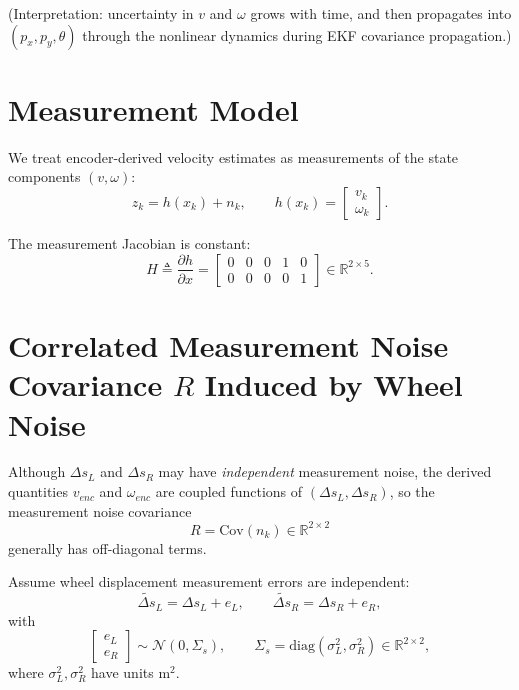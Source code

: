 \documentclass[11pt]{article}
\begin{document}
(Interpretation: uncertainty in $v$ and $\omega$ grows with time, and then propagates into $(p_x,p_y,\theta)$ through the nonlinear dynamics during EKF covariance propagation.)

\section*{Measurement Model}

We treat encoder-derived velocity estimates as measurements of the state components $(v,\omega)$:
\begin{equation}
z_k = h(x_k) + n_k,
\qquad
h(x_k)=
\begin{bmatrix}
v_k\\
\omega_k
\end{bmatrix}.
\end{equation}

The measurement Jacobian is constant:
\begin{equation}
H \triangleq \frac{\partial h}{\partial x} =
\begin{bmatrix}
0 & 0 & 0 & 1 & 0\\
0 & 0 & 0 & 0 & 1
\end{bmatrix}
\in \mathbb{R}^{2\times 5}.
\end{equation}

\section*{Correlated Measurement Noise Covariance $R$ Induced by Wheel Noise}

Although $\Delta s_{L}$ and $\Delta s_{R}$ may have \emph{independent} measurement noise, the derived quantities
$v_{enc}$ and $\omega_{enc}$ are coupled functions of $(\Delta s_L,\Delta s_R)$, so the measurement noise covariance
\begin{equation}
R = \mathrm{Cov}(n_k) \in \mathbb{R}^{2\times2}
\end{equation}
generally has off-diagonal terms.

Assume wheel displacement measurement errors are independent:
\begin{equation}
\tilde{\Delta s}_L = \Delta s_L + e_L,\qquad \tilde{\Delta s}_R = \Delta s_R + e_R,
\end{equation}
with
\begin{equation}
\begin{bmatrix}e_L\\e_R\end{bmatrix}\sim\mathcal{N}\!\left(0,\Sigma_s\right),
\qquad
\Sigma_s=\mathrm{diag}(\sigma_L^2,\sigma_R^2)\in\mathbb{R}^{2\times2},
\end{equation}
where $\sigma_L^2,\sigma_R^2$ have units $\text{m}^2$.
\end{document}
